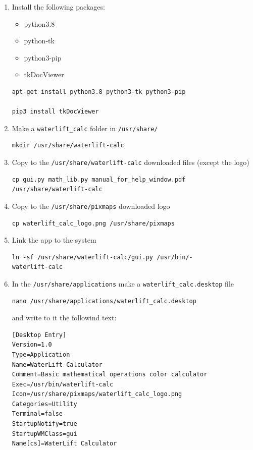 \documentclass[a5paper, 10pt]{article}
\begin{document}
\begin{enumerate}
        \item Install the following packages:
            \begin{itemize}
                \item python3.8
	            \item python-tk
	            \item python3-pip
	            \item tkDocViewer
            \end{itemize}
            \lstset{language=bash, frame=lines}
            \begin{lstlisting}
apt-get install python3.8 python3-tk python3-pip

pip3 install tkDocViewer
            \end{lstlisting}
        \item Make a \texttt{waterlift\_calc} folder in \texttt{/usr/share/}
            \lstset{language=bash, frame=lines}
            \begin{lstlisting}
mkdir /usr/share/waterlift-calc
            \end{lstlisting}
        \item Copy to the \texttt{/usr/share/waterlift-calc} downloaded files (except the logo)
            \lstset{language=bash, frame=lines}
            \begin{lstlisting}
cp gui.py math_lib.py manual_for_help_window.pdf 
/usr/share/waterlift-calc
            \end{lstlisting}
        \item Copy to the \texttt{/usr/share/pixmaps} downloaded logo
            \lstset{language=bash, frame=lines}
            \begin{lstlisting}
cp waterlift_calc_logo.png /usr/share/pixmaps
            \end{lstlisting}
        \item Link the app to the system
            \lstset{language=bash, frame=lines}
            \begin{lstlisting}
ln -sf /usr/share/waterlift-calc/gui.py /usr/bin/-
waterlift-calc
            \end{lstlisting}
        \item In the \texttt{/usr/share/applications} make a \texttt{waterlift\_calc.desktop} file
        \lstset{language=bash, frame=lines}
            \begin{lstlisting}
nano /usr/share/applications/waterlift_calc.desktop
            \end{lstlisting}
        and write to it the followind text:
            \begin{lstlisting}
[Desktop Entry]
Version=1.0
Type=Application
Name=WaterLift Calculator
Comment=Basic mathematical operations color calculator
Exec=/usr/bin/waterlift-calc
Icon=/usr/share/pixmaps/waterlift_calc_logo.png
Categories=Utility
Terminal=false
StartupNotify=true
StartupWMClass=gui
Name[cs]=WaterLift Calculator
            \end{lstlisting}
    \end{enumerate}
\end{document}
